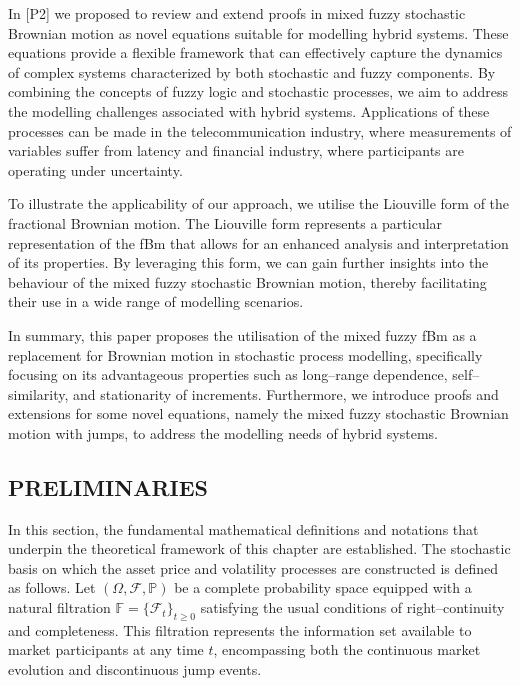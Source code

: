 \documentclass[12pt,a4paper]{report}
\numberwithin{equation}{section}
\begin{document}
In [P2] we proposed to review and extend proofs in mixed fuzzy
stochastic Brownian motion as novel equations suitable for modelling
hybrid systems. These equations provide a flexible framework that can
effectively capture the dynamics of complex systems characterized by
both stochastic and fuzzy components. By combining the concepts of fuzzy
logic and stochastic processes, we aim to address the modelling
challenges associated with hybrid systems. Applications of these
processes can be made in the telecommunication industry, where
measurements of variables suffer from latency and financial industry,
where participants are operating under uncertainty.

To illustrate the applicability of our approach, we utilise the
Liouville form of the fractional Brownian motion. The Liouville form
represents a particular representation of the fBm that allows for an
enhanced analysis and interpretation of its properties. By leveraging
this form, we can gain further insights into the behaviour of the mixed
fuzzy stochastic Brownian motion, thereby facilitating their use in a
wide range of modelling scenarios.

In summary, this paper proposes the utilisation of the mixed fuzzy fBm
as a replacement for Brownian motion in stochastic process modelling,
specifically focusing on its advantageous properties such as long--range
dependence, self--similarity, and stationarity of increments.
Furthermore, we introduce proofs and extensions for some novel
equations, namely the mixed fuzzy stochastic Brownian motion with jumps,
to address the modelling needs of hybrid systems.

\hypertarget{preliminaries}{%
\subsection{\texorpdfstring{PRELIMINARIES
}{PRELIMINARIES }}\label{preliminaries}}

In this section, the fundamental mathematical definitions and notations that underpin the theoretical framework of this chapter are established. The stochastic basis on which the asset price and volatility processes are constructed is defined as follows. Let $(\Omega, \mathcal{F}, \mathbb{P})$ be a complete probability space equipped with a natural filtration $\mathbb{F} = \{\mathcal{F}_t\}_{t \geq 0}$ satisfying the usual conditions of right--continuity and completeness. This filtration represents the information set available to market participants at any time $t$, encompassing both the continuous market evolution and discontinuous jump events.
\end{document}
